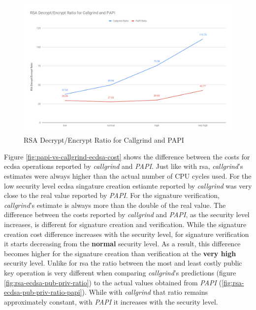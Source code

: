 \documentclass{llncs}
\begin{document}
\begin{figure}
  \centering
  \includegraphics[width=1.0\textwidth]{img/papi-vs-callgrind-rsa-encr-ratio.png}
  \centering \caption{\label{fig:papi-vs-rsa-ecnr-ratio} RSA Decrypt/Encrypt Ratio for Callgrind and PAPI}
\end{figure}


Figure \ref{fig:papi-vs-callgrind-ecdsa-cost} shows the difference between the costs for \gls{ecdsa} operations reported by \textit{callgrind} 
and \textit{PAPI}.
Just like with \gls{rsa}, \textit{callgrind}'s estimates were always higher than the actual number of CPU cycles used. For the low security
level \gls{ecdsa} singature creation estiamte reported by \textit{callgrind} was very close to the real value reported by \textit{PAPI}.
For the signature verification, \textit{callgrind}'s estimate is always more than the double of the real value. The difference between
the costs reported by \textit{callgrind} and \textit{PAPI}, as the security level increases, is different for signature creation and verification.
While the signature creation cost difference increases with the security level, for signature verification it starts decreasing from the \textbf{normal}
security level. As a result, this difference becomes higher for the signature creation than verification at the \textbf{very high} security level.
Unlike for \gls{rsa} the ratio between the most and least costly public key operation is very different when comparing \textit{callgrind}'s predictions
(figure \ref{fig:rsa-ecdsa-pub-priv-ratio}) to the actual values obtained from \textit{PAPI} (\ref{fig:rsa-ecdsa-pub-priv-ratio-papi}).
While with \textit{callgrind} that ratio remains approximately constant, with \textit{PAPI} it increases with the security level.
\end{document}
